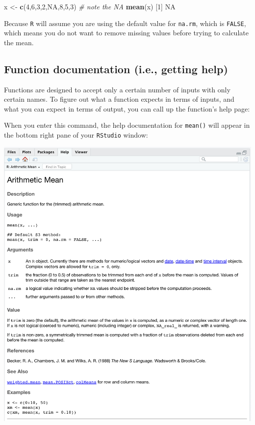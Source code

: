 \documentclass[]{book}
\newenvironment{Shaded}{\begin{snugshade}}{\end{snugshade}}
\newcommand{\CommentTok}[1]{\textcolor[rgb]{0.56,0.35,0.01}{\textit{#1}}}
\newcommand{\DecValTok}[1]{\textcolor[rgb]{0.00,0.00,0.81}{#1}}
\newcommand{\KeywordTok}[1]{\textcolor[rgb]{0.13,0.29,0.53}{\textbf{#1}}}
\newcommand{\NormalTok}[1]{#1}
\newcommand{\OtherTok}[1]{\textcolor[rgb]{0.56,0.35,0.01}{#1}}
\newcommand{\StringTok}[1]{\textcolor[rgb]{0.31,0.60,0.02}{#1}}
\begin{document}
\begin{Shaded}
\begin{Highlighting}[]
\NormalTok{x <-}\StringTok{ }\KeywordTok{c}\NormalTok{(}\DecValTok{4}\NormalTok{,}\DecValTok{6}\NormalTok{,}\DecValTok{3}\NormalTok{,}\DecValTok{2}\NormalTok{,}\OtherTok{NA}\NormalTok{,}\DecValTok{8}\NormalTok{,}\DecValTok{5}\NormalTok{,}\DecValTok{3}\NormalTok{)  }\CommentTok{# note the NA}
\KeywordTok{mean}\NormalTok{(x)}
\NormalTok{[}\DecValTok{1}\NormalTok{] }\OtherTok{NA}
\end{Highlighting}
\end{Shaded}

Because \texttt{R} will assume you are using the default value for \texttt{na.rm}, which is \texttt{FALSE}, which means you do not want to remove missing values before trying to calculate the mean.

\hypertarget{function-documentation-i.e.-getting-help}{%
\subsection*{Function documentation (i.e., getting help)}\label{function-documentation-i.e.-getting-help}}

Functions are designed to accept only a certain number of inputs with only certain names. To figure out what a function expects in terms of inputs, and what you can expect in terms of output, you can call up the function's help page:

When you enter this command, the help documentation for \texttt{mean()} will appear in the bottom right pane of your \texttt{RStudio} window:

\includegraphics{img/functions_help.png}
\end{document}
